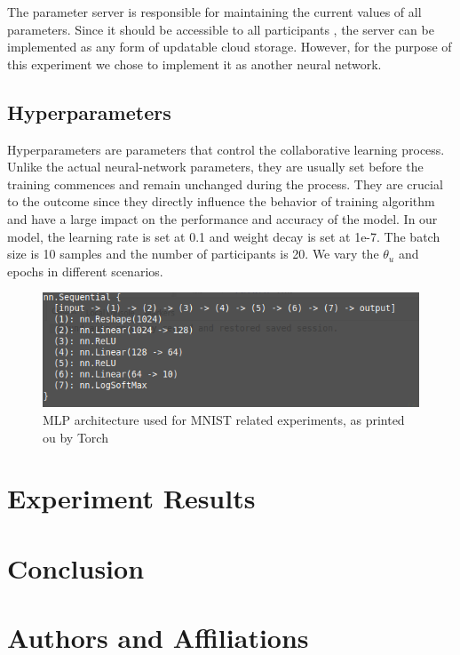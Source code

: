 \documentclass[conference]{IEEEtran}
\begin{document}
The parameter server is responsible for maintaining the current values of all parameters. Since it should be accessible to all participants , the server can be implemented as any form of updatable cloud storage. However, for the purpose of this experiment we chose to implement it as another neural network. 

\subsection{Hyperparameters}
Hyperparameters are parameters that control the collaborative learning process. Unlike the actual neural-network parameters, they are usually set before the training commences and remain unchanged during the process.
They are crucial to the outcome since they directly influence the behavior of training algorithm and have a large impact on the performance and accuracy of the model.
In our model, the learning rate is set at 0.1 and weight decay is set at 1e-7. The batch size is 10 samples and the number of participants is 20. We vary the $\theta_u$ and epochs in different scenarios. 

\begin{figure}[!h]
\includegraphics{MLPArchitecture}
\caption{MLP architecture used for MNIST related experiments, as printed ou by Torch}
\label{fig:MLPArch}

\end{figure}


\section{Experiment Results}

\section{Conclusion}


\section{Authors and Affiliations}
\end{document}
